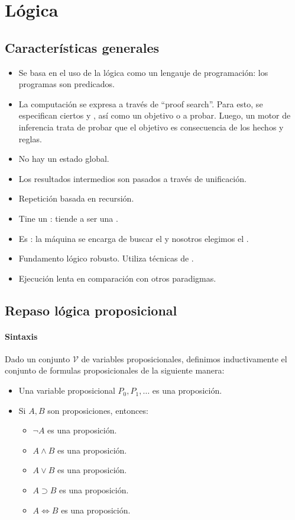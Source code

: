 \section{Lógica}

\subsection{Características generales}

\begin{itemize}
  \item Se basa en el uso de la lógica como un lengauje de programación: los programas son predicados.
  \item La computación se expresa a través de ``proof search''. Para esto, se especifican ciertos  y , así como un objetivo o  a probar. Luego, un motor de inferencia trata de probar que el objetivo es consecuencia de los hechos y reglas.
  \item No hay un estado global.
  \item Los resultados intermedios son pasados a través de unificación.
  \item Repetición basada en recursión.
  \item Tine un : tiende a ser una .
  \item Es : la máquina se encarga de buscar el  y nosotros elegimos el .
  \item Fundamento lógico robusto. Utiliza técnicas de .
  \item Ejecución lenta en comparación con otros paradigmas.
\end{itemize}

\subsection{Repaso lógica proposicional}

\paragraph{Sintaxis}

Dado un conjunto $\mathcal{V}$ de variables proposicionales, definimos inductivamente el conjunto de formulas proposicionales de la siguiente manera:

\begin{itemize}
  \item Una variable proposicional $P_0, P_1, \dots$ es una proposición.
  \item Si $A, B$ son proposiciones, entonces:
    \begin{itemize}
      \item $\lnot A$ es una proposición.
      \item $A \land B$ es una proposición.
      \item $A \lor B$ es una proposición.
      \item $A \supset B$ es una proposición.
      \item $A \iff B$ es una proposición.
    \end{itemize}
\end{itemize}

